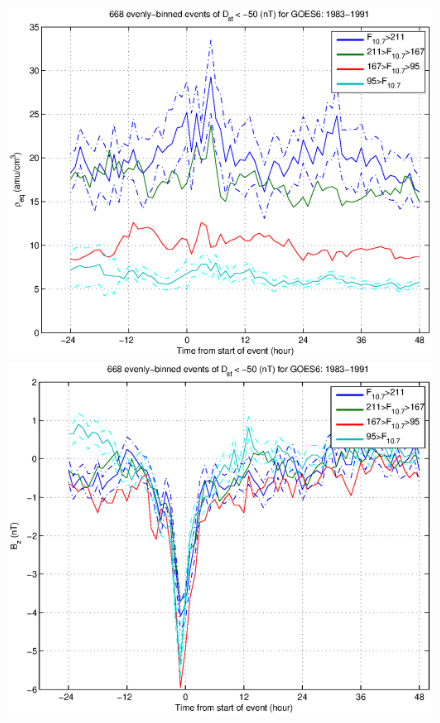 \documentclass[10pt,twocolumn]{article}
\begin{document}
\begin{figure}[tp!]
\centering
\includegraphics[scale=0.40]{paperfigures/HighLowF107rhoeq-Dst50-GOES6-1983-1991.eps}
\includegraphics[scale=0.40]{paperfigures/HighLowF107Bz-Dst50-GOES6-1983-1991.eps}

\end{figure}
\end{document}

